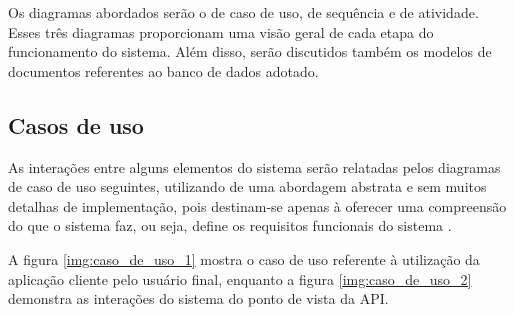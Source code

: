 Os diagramas abordados serão o de caso de uso, de sequência e de atividade. Esses três diagramas proporcionam uma visão geral de cada etapa do funcionamento do sistema. Além disso, serão discutidos também os modelos de documentos referentes ao banco de dados adotado.

\subsection{Casos de uso} \label{subsec:casosDeUso}

As interações entre alguns elementos do sistema serão relatadas pelos diagramas de caso de uso seguintes, utilizando de uma abordagem abstrata e sem muitos detalhas de implementação, pois destinam-se apenas à oferecer uma compreensão do que o sistema faz, ou seja, define os requisitos funcionais do sistema \cite{sommerville2011engenharia}.

A figura \ref{img:caso_de_uso_1} mostra o caso de uso referente à utilização da aplicação cliente pelo usuário final, enquanto a figura \ref{img:caso_de_uso_2} demonstra as interações do sistema do ponto de vista da API.


